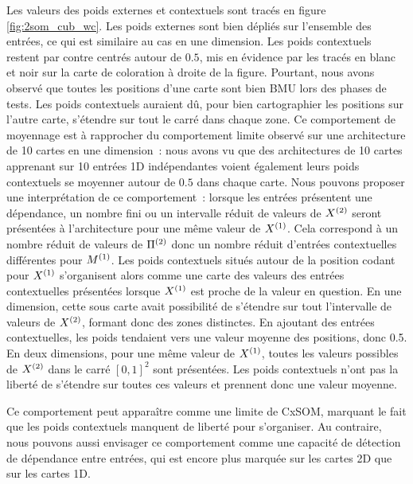 \documentclass[../main]{subfiles}
\begin{document}
Les valeurs des poids externes et contextuels sont tracés en figure \ref{fig:2som_cub_wc}.
Les poids externes sont bien dépliés sur l'ensemble des entrées, ce qui est similaire au cas en une dimension.
Les poids contextuels restent par contre centrés autour de $0.5$, mis en évidence par les tracés en blanc et noir sur la carte de coloration à droite de la figure.
Pourtant, nous avons observé que toutes les positions d'une carte sont bien BMU lors des phases de tests. 
Les poids contextuels auraient dû, pour bien cartographier les positions sur l'autre carte, s'étendre sur tout le carré dans chaque zone.
Ce comportement de moyennage est à rapprocher du comportement limite observé sur une architecture de 10 cartes en une dimension~: nous avons vu que des architectures de 10 cartes apprenant sur 10 entrées 1D indépendantes voient également leurs poids contextuels se moyenner autour de $0.5$ dans chaque carte.
Nous pouvons proposer une interprétation de ce comportement~: lorsque les entrées présentent une  dépendance, un nombre fini ou un intervalle réduit de valeurs de $X^{({2})}$ seront présentées à l'architecture pour une même valeur de $X^{({1})}$. Cela correspond à un nombre réduit de valeurs de $\Pi^{({2})}$ donc un nombre réduit d'entrées contextuelles différentes pour $M^{({1})}$. 
Les poids contextuels situés autour de la position codant pour $X^{({1})}$ s'organisent alors comme une carte des valeurs des entrées contextuelles présentées lorsque $X^{({1})}$ est proche de la valeur en question. En une dimension, cette sous carte avait possibilité de s'étendre sur tout l'intervalle de valeurs de $X^{({2})}$, formant donc des zones distinctes. En ajoutant des entrées contextuelles, les poids tendaient vers une valeur moyenne des positions, donc 0.5.
En deux dimensions, pour une même valeur de $X^{({1})}$, toutes les valeurs possibles de $X^{({2})}$ dans le carré $[0,1]^2$ sont présentées. Les poids contextuels n'ont pas la liberté de s'étendre sur toutes ces valeurs et prennent donc une valeur moyenne.

Ce comportement peut apparaître comme une limite de CxSOM, marquant le fait que les poids contextuels manquent de liberté pour s'organiser.
Au contraire, nous pouvons aussi envisager ce comportement comme une capacité de détection de dépendance entre entrées, qui est encore plus marquée sur les cartes 2D que sur les cartes 1D. 
\end{document}
